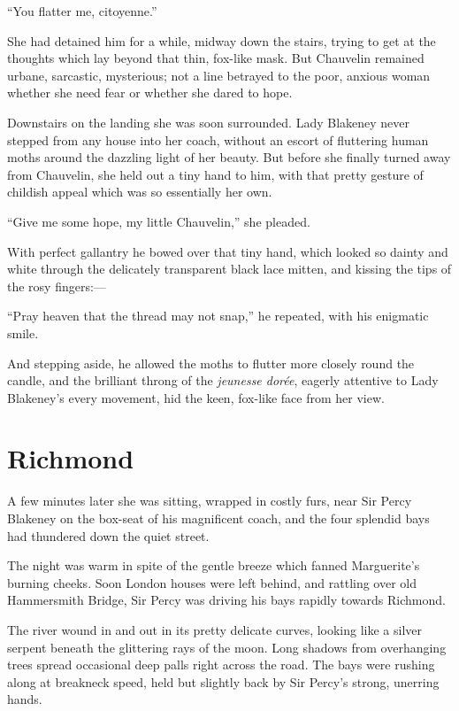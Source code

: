 \documentclass[paper=a5,BCOR=7mm,twoside,DIV=calc,12pt,usegeometry,chapterprefix,endperiod,headings=big]{scrbook}
\begin{document}
\enquote{You flatter me, citoyenne.}

She had detained him for a while, midway down the stairs, trying to get at the thoughts which lay beyond that thin, fox-like mask. But Chauvelin remained urbane, sarcastic, mysterious; not a line betrayed to the poor, anxious woman whether she need fear or whether she dared to hope.

Downstairs on the landing she was soon surrounded. Lady Blakeney never stepped from any house into her coach, without an escort of fluttering human moths around the dazzling light of her beauty. But before she finally turned away from Chauvelin, she held out a tiny hand to him, with that pretty gesture of childish appeal which was so essentially her own.

\enquote{Give me some hope, my little Chauvelin,} she pleaded.

With perfect gallantry he bowed over that tiny hand, which looked so dainty and white through the delicately transparent black lace mitten, and kissing the tips of the rosy fingers:---

\enquote{Pray heaven that the thread may not snap,} he repeated, with his enigmatic smile.

And stepping aside, he allowed the moths to flutter more closely round the candle, and the brilliant throng of the \textit{jeunesse dorée}, eagerly attentive to Lady Blakeney's every movement, hid the keen, fox-like face from her view.

\chapter{Richmond}
\lettrine[lines=4]{A}{} few minutes later she was sitting, wrapped in costly furs, near Sir Percy Blakeney on the box-seat of his magnificent coach, and the four splendid bays had thundered down the quiet street.

The night was warm in spite of the gentle breeze which fanned Marguerite's burning cheeks. Soon London houses were left behind, and rattling over old Hammersmith  Bridge, Sir Percy was driving his bays rapidly towards Richmond.

The river wound in and out in its pretty delicate curves, looking like a silver serpent beneath the glittering rays of the moon. Long shadows from overhanging trees spread occasional deep palls right across the road. The bays were rushing along at breakneck speed, held but slightly back by Sir Percy's strong, unerring hands.
\end{document}
